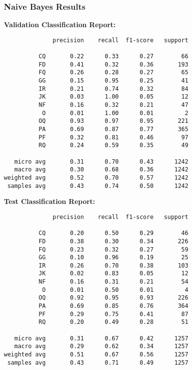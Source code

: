 \documentclass{article}
\begin{document}
\subsubsection{Naive Bayes Results}
\textbf{Validation Classification Report:}
\begin{verbatim}
              precision    recall  f1-score   support

          CQ       0.22      0.33      0.27        66
          FD       0.41      0.32      0.36       193
          FQ       0.26      0.28      0.27        65
          GG       0.15      0.95      0.25        41
          IR       0.21      0.74      0.32        84
          JK       0.03      1.00      0.05        12
          NF       0.16      0.32      0.21        47
           O       0.01      1.00      0.01         2
          OQ       0.93      0.97      0.95       221
          PA       0.69      0.87      0.77       365
          PF       0.32      0.81      0.46        97
          RQ       0.24      0.59      0.35        49

   micro avg       0.31      0.70      0.43      1242
   macro avg       0.30      0.68      0.36      1242
weighted avg       0.52      0.70      0.57      1242
 samples avg       0.43      0.74      0.50      1242
\end{verbatim}
\textbf{Test Classification Report:}
\begin{verbatim}
              precision    recall  f1-score   support

          CQ       0.20      0.50      0.29        46
          FD       0.38      0.30      0.34       226
          FQ       0.23      0.32      0.27        59
          GG       0.10      0.96      0.19        25
          IR       0.26      0.70      0.38       103
          JK       0.02      0.83      0.05        12
          NF       0.16      0.31      0.21        54
           O       0.01      0.50      0.01         4
          OQ       0.92      0.95      0.93       226
          PA       0.69      0.85      0.76       364
          PF       0.29      0.75      0.41        87
          RQ       0.20      0.49      0.28        51

   micro avg       0.31      0.67      0.42      1257
   macro avg       0.29      0.62      0.34      1257
weighted avg       0.51      0.67      0.56      1257
 samples avg       0.43      0.71      0.49      1257
\end{verbatim}
\end{document}
